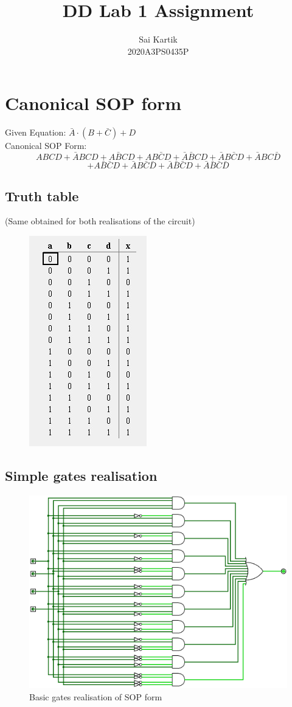 \documentclass[12pt]{article}
\title{DD Lab 1 Assignment}
\author{Sai Kartik \\2020A3PS0435P}
\begin{document}
\maketitle
\section*{Canonical SOP form}
Given Equation: \(\bar{A}\cdot(B+\bar{C})+D\)\\
Canonical SOP Form:
$$ABCD+\bar{A}BCD+A\bar{B}CD+AB\bar{C}D+\bar{A}\bar{B}CD+\bar{A}B\bar{C}D+\bar{A}BC\bar{D}$$ $$+A\bar{B}\bar{C}D+\bar{A}B\bar{C}\bar{D}+\bar{A}\bar{B}\bar{C}D+\bar{A}\bar{B}\bar{C}\bar{D}$$
\subsection*{Truth table}
(Same obtained for both realisations of the circuit)
\begin{center}
    \begin{figure}[ht]
        \includegraphics[scale=0.80]{TT.jpg}
    \end{figure}
\end{center}
\newpage
\subsection*{Simple gates realisation}
\begin{figure}[ht]
    \includegraphics[scale=0.45]{SOP_basic.png}
    \caption{Basic gates realisation of SOP form}
\end{figure}
\newpage
\end{document}
